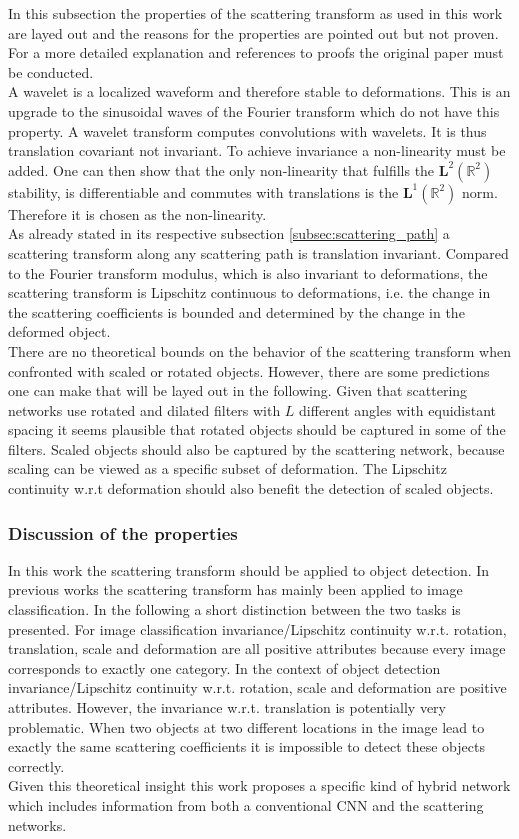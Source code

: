 In this subsection the properties of the scattering transform as used in this work are layed out and the reasons for the properties are pointed out but not proven. For a more detailed explanation and references to proofs the original paper \cite{scatteringTransform2012} must be conducted. \\
A wavelet is a localized waveform and therefore stable to deformations. This is an upgrade to the sinusoidal waves of the Fourier transform which do not have this property. 
A wavelet transform computes convolutions with wavelets. It is thus translation covariant not invariant. To achieve invariance a non-linearity must be added. One can then show that the only non-linearity that fulfills the $\textbf{L}^2(\mathbb{R}^2)$ stability, is differentiable and commutes with translations is the $\textbf{L}^1(\mathbb{R}^2)$ norm. Therefore it is chosen as the non-linearity. \\
As already stated in its respective subsection \ref{subsec:scattering_path} a scattering transform along any scattering path is translation invariant. 
Compared to the Fourier transform modulus, which is also invariant to deformations, the scattering transform is Lipschitz continuous to deformations, i.e. the change in the scattering coefficients is bounded and determined by the change in the deformed object. \\
There are no theoretical bounds on the behavior of the scattering transform when confronted with scaled or rotated objects. However, there are some predictions one can make that will be layed out in the following. Given that scattering networks use rotated and dilated filters with $L$ different angles with equidistant spacing it seems plausible that rotated objects should be captured in some of the filters. Scaled objects should also be captured by the scattering network, because scaling can be viewed as a specific subset of deformation. The Lipschitz continuity w.r.t deformation should also benefit the detection of scaled objects. 

\subsubsection{Discussion of the properties}

In this work the scattering transform should be applied to object detection. In previous works the scattering transform has mainly been applied to image classification. In the following a short distinction between the two tasks is presented. For image classification invariance/Lipschitz continuity w.r.t. rotation, translation, scale and deformation are all positive attributes because every image corresponds to exactly one category. In the context of object detection invariance/Lipschitz continuity w.r.t. rotation, scale and deformation are positive attributes. However, the invariance w.r.t. translation is potentially very problematic. When two objects at two different locations in the image lead to exactly the same scattering coefficients it is impossible to detect these objects correctly. \\
Given this theoretical insight this work proposes a specific kind of hybrid network which includes information from both a conventional CNN and the scattering networks. 

